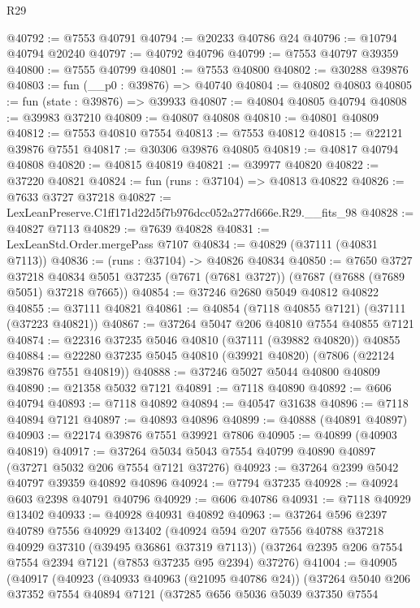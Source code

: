 \begin{lexlean}{R29}
\begin{coremodule}
@40792 := @7553 @40791
@40794 := @20233 @40786 @24
@40796 := @10794 @40794 @20240
@40797 := @40792 @40796
@40799 := @7553 @40797 @39359
@40800 := @7555 @40799
@40801 := @7553 @40800
@40802 := @30288 @39876
@40803 := fun (__p0 : @39876) => @40740
@40804 := @40802 @40803
@40805 := fun (state : @39876) => @39933
@40807 := @40804 @40805 @40794
@40808 := @39983 @37210
@40809 := @40807 @40808
@40810 := @40801 @40809
@40812 := @7553 @40810 @7554
@40813 := @7553 @40812
@40815 := @22121 @39876 @7551
@40817 := @30306 @39876 @40805
@40819 := @40817 @40794 @40808
@40820 := @40815 @40819
@40821 := @39977 @40820
@40822 := @37220 @40821
@40824 := fun (runs : @37104) => @40813 @40822
@40826 := @7633 @3727 @37218
@40827 := LexLeanPreserve.C1ff171d22d5f7b976dcc052a277d666e.R29.__fits_98
@40828 := @40827 @7113
@40829 := @7639 @40828
@40831 := LexLeanStd.Order.mergePass @7107
@40834 := @40829 (@37111 (@40831 @7113))
@40836 := (runs : @37104) -> @40826 @40834
@40850 := @7650
    @3727
    @37218
    @40834
    @5051
    @37235
    (@7671 (@7681 @3727))
    (@7687 (@7688 (@7689 @5051) @37218 @7665))
@40854 := @37246 @2680 @5049 @40812 @40822
@40855 := @37111 @40821
@40861 := @40854 (@7118 @40855 @7121) (@37111 (@37223 @40821))
@40867 := @37264 @5047 @206 @40810 @7554 @40855 @7121
@40874 := @22316 @37235 @5046 @40810 (@37111 (@39882 @40820)) @40855
@40884 := @22280 @37235 @5045 @40810 (@39921 @40820) (@7806 (@22124 @39876 @7551 @40819))
@40888 := @37246 @5027 @5044 @40800 @40809
@40890 := @21358 @5032 @7121
@40891 := @7118 @40890
@40892 := @606 @40794
@40893 := @7118 @40892
@40894 := @40547 @31638
@40896 := @7118 @40894 @7121
@40897 := @40893 @40896
@40899 := @40888 (@40891 @40897)
@40903 := @22174 @39876 @7551 @39921 @7806
@40905 := @40899 (@40903 @40819)
@40917 := @37264 @5034 @5043 @7554 @40799 @40890 @40897 (@37271 @5032 @206 @7554 @7121 @37276)
@40923 := @37264 @2399 @5042 @40797 @39359 @40892 @40896
@40924 := @7794 @37235
@40928 := @40924 @603 @2398 @40791 @40796
@40929 := @606 @40786
@40931 := @7118 @40929 @13402
@40933 := @40928 @40931 @40892
@40963 := @37264
    @596
    @2397
    @40789
    @7556
    @40929
    @13402
    (@40924 @594 @207 @7556 @40788 @37218 @40929 @37310 (@39495 @36861 @37319 @7113))
    (@37264 @2395 @206 @7554 @7554 @2394 @7121 (@7853 @37235 @95 @2394) @37276)
@41004 := @40905
    (@40917
      (@40923
        (@40933 @40963 (@21095 @40786 @24))
        (@37264
          @5040
          @206
          @37352
          @7554
          @40894
          @7121
          (@37285
            @656
            @5036
            @5039
            @37350
            @7554

\end{coremodule}
\end{lexlean}
